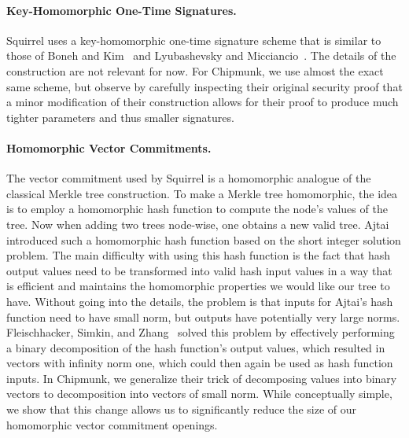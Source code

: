 \paragraph{Key-Homomorphic One-Time Signatures.}
Squirrel uses a key-homomorphic one-time signature scheme that is similar to those of Boneh and Kim~\cite{BonKim2020} and Lyubashevsky and Micciancio~\cite{TCC:LyuMic08}.
The details of the construction are not relevant for now.
For Chipmunk, we use almost the exact same scheme, but observe by carefully inspecting their original security proof that a minor modification of their construction allows for their proof to produce much tighter parameters and thus smaller signatures.

\paragraph{Homomorphic Vector Commitments.}
The vector commitment used by Squirrel is a homomorphic analogue of the classical Merkle tree construction.
To make a Merkle tree homomorphic, the idea is to employ a homomorphic hash function to compute the node's values of the tree.
Now when adding two trees node-wise, one obtains a new valid tree.
Ajtai~\cite{ICALP:Ajtai99} introduced such a homomorphic hash function based on the short integer solution problem.
The main difficulty with using this hash function is the fact that hash output values need to be transformed into valid hash input values in a way that is efficient and maintains the homomorphic properties we would like our tree to have.
Without going into the details, the problem is that inputs for Ajtai's hash function need to have small norm, but outputs have potentially very large norms.
Fleischhacker, Simkin, and Zhang~\cite{CCS:FleSimZha22} solved this problem by effectively performing a binary decomposition of the hash function's output values, which resulted in vectors with infinity norm one, which could then again be used as hash function inputs.
In Chipmunk, we generalize their trick of decomposing values into binary vectors to decomposition into vectors of small norm.
While conceptually simple, we show that this change allows us to significantly reduce the size of our homomorphic vector commitment openings.

